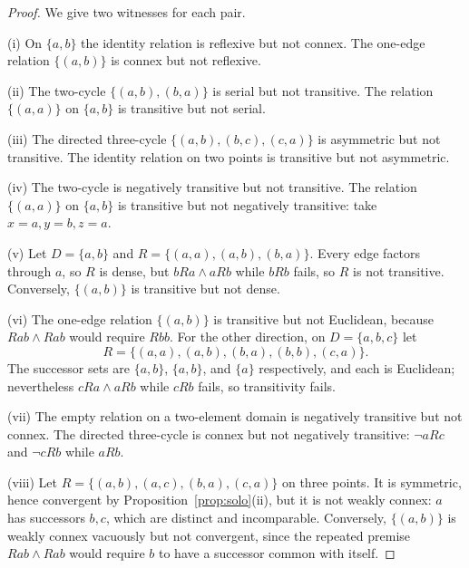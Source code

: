 \documentclass[10pt,a4paper]{amsart}
\begin{document}
\begin{proof}
We give two witnesses for each pair.

(i) On $\{a,b\}$ the identity relation is reflexive but not connex.  The
one-edge relation $\{(a,b)\}$ is connex but not reflexive.

(ii) The two-cycle $\{(a,b),(b,a)\}$ is serial but not transitive.  The relation
$\{(a,a)\}$ on $\{a,b\}$ is transitive but not serial.

(iii) The directed three-cycle
$\{(a,b),(b,c),(c,a)\}$ is asymmetric but not transitive.  The identity
relation on two points is transitive but not asymmetric.

(iv) The two-cycle is negatively transitive but not transitive.  The relation
$\{(a,a)\}$ on $\{a,b\}$ is transitive but not negatively transitive: take
$x=a,y=b,z=a$.

(v) Let $D=\{a,b\}$ and
$R=\{(a,a),(a,b),(b,a)\}$.  Every edge factors through $a$, so $R$ is dense,
but $bRa\wedge aRb$ while $bRb$ fails, so $R$ is not transitive.  Conversely,
$\{(a,b)\}$ is transitive but not dense.

(vi) The one-edge relation $\{(a,b)\}$ is transitive but not Euclidean,
because $Rab\wedge Rab$ would require $Rbb$.  For the other direction, on
$D=\{a,b,c\}$ let
\[
R=\{(a,a),(a,b),(b,a),(b,b),(c,a)\}.
\]
The successor sets are $\{a,b\}$, $\{a,b\}$, and $\{a\}$ respectively, and
each is Euclidean; nevertheless $cRa\wedge aRb$ while $cRb$ fails, so
transitivity fails.

(vii) The empty relation on a two-element domain is negatively transitive but
not connex.  The directed three-cycle is connex but not negatively transitive:
$\neg aRc$ and $\neg cRb$ while $aRb$.

(viii) Let
$R=\{(a,b),(a,c),(b,a),(c,a)\}$ on three points.  It is symmetric, hence
convergent by Proposition~\ref{prop:solo}(ii), but it is not weakly connex:
$a$ has successors $b,c$, which are distinct and incomparable.  Conversely,
$\{(a,b)\}$ is weakly connex vacuously but not convergent, since the repeated
premise $Rab\wedge Rab$ would require $b$ to have a successor common with
itself.
\end{proof}
\end{document}
